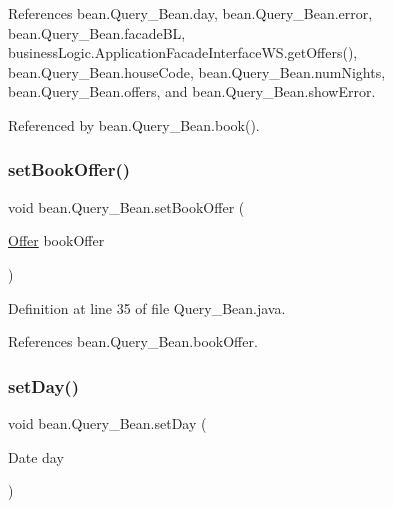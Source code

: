 References bean.\+Query\+\_\+\+Bean.\+day, bean.\+Query\+\_\+\+Bean.\+error, bean.\+Query\+\_\+\+Bean.\+facade\+BL, business\+Logic.\+Application\+Facade\+Interface\+W\+S.\+get\+Offers(), bean.\+Query\+\_\+\+Bean.\+house\+Code, bean.\+Query\+\_\+\+Bean.\+num\+Nights, bean.\+Query\+\_\+\+Bean.\+offers, and bean.\+Query\+\_\+\+Bean.\+show\+Error.



Referenced by bean.\+Query\+\_\+\+Bean.\+book().

\mbox{\label{classbean_1_1Query__Bean_a1d4d548f29f696871171ff5d7eca964a}} 
\subsubsection{\texorpdfstring{setBookOffer()}{setBookOffer()}}
{\footnotesize\ttfamily void bean.\+Query\+\_\+\+Bean.\+set\+Book\+Offer (\begin{DoxyParamCaption}\item[{\mbox{\hyperlink{classdomain_1_1Offer}{Offer}}}]{book\+Offer }\end{DoxyParamCaption})}



Definition at line 35 of file Query\+\_\+\+Bean.\+java.


\begin{DoxyCode}{0}

\end{DoxyCode}


References bean.\+Query\+\_\+\+Bean.\+book\+Offer.

\mbox{\label{classbean_1_1Query__Bean_ab1e76631718151a10efad6a17c43cb5d}} 
\subsubsection{\texorpdfstring{setDay()}{setDay()}}
{\footnotesize\ttfamily void bean.\+Query\+\_\+\+Bean.\+set\+Day (\begin{DoxyParamCaption}\item[{Date}]{day }\end{DoxyParamCaption})}



